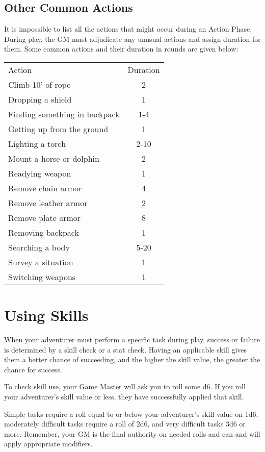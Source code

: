 \subsection{Other Common Actions}
It is impossible to list all the actions that might occur during an Action Phase. During play, the GM must adjudicate any unusual actions and assign duration for them. Some common actions and their duration in rounds are given below:
\begin{normboxc}

\small
\begin{tabular}{@{}l c}
Action & Duration\\
Climb 10' of rope & 2\\
Dropping a shield & 1\\
Finding something in backpack & 1-4\\
Getting up from the ground & 1\\
Lighting a torch & 2-10\\
Mount a horse or dolphin & 2\\
Readying weapon & 1\\
Remove chain armor & 4\\
Remove leather armor & 2\\
Remove plate armor & 8\\
Removing backpack & 1\\
Searching a body & 5-20\\
Survey a situation & 1\\
Switching weapons & 1\\
\end{tabular}
\end{normboxc}
\section{Using Skills}
When your adventurer must perform a specific task during play, success or failure is determined by a skill check or a stat check. Having an applicable skill gives them a better chance of succeeding, and the higher the skill value, the greater the chance for success.

To check skill use, your Game Master will ask you to roll some d6. If you roll your adventurer's skill value or less, they have successfully applied that skill.

Simple tasks require a roll equal to or below your adventurer's skill value on 1d6; moderately difficult tasks require a roll of 2d6, and very difficult tasks 3d6 or more. Remember, your GM is the final authority on needed rolls and can and will apply appropriate modifiers.
